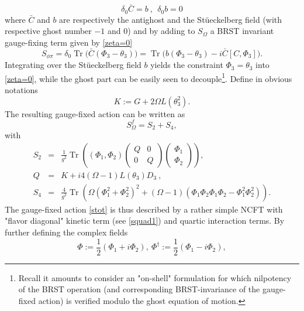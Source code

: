 \documentclass[a4paper,11pt,twoside]{article}
\numberwithin{equation}{section}
\DeclareMathOperator{\tr}{Tr}
\theoremstyle{nonumberplain}
\newcounter{and}
\begin{document}
%
\begin{equation}
\delta_0 {\bar{C}} = b \ , \ \ \delta_0b = 0 \label{contractible-brs}
\end{equation}
%
where ${\bar{C}}$ and $b$ are respectively the antighost and the St\"ueckelberg field (with respective ghost number $-1$ and $0$) and by adding to $S_\Omega$ a BRST invariant gauge-fixing term given by \eqref{zeta=0}%
%
\begin{equation}
S_{\phi\pi}=\delta_0\tr\big({\bar{C}}(\Phi_3-\theta_3) \big)=\tr\big(b(\Phi_3-\theta_3)-i{\bar{C}}[C,\Phi_3]\big)\label{gauge-fix}.
\end{equation}
%
Integrating over the St\"ueckelberg field $b$ yields the constraint $\Phi_3=\theta_3$ into \eqref{zeta=0}, while the ghost part can be easily seen to decouple{\footnote{Recall it amounts to consider an "on-shell" formulation for which nilpotency of the BRST operation (and corresponding BRST-invariance of the gauge-fixed action) is verified modulo the ghost equation of motion.}}. Define in obvious notations%
%
\begin{equation}
K:=G+2\Omega L(\theta_3^2)\label{operator-K}.
\end{equation}
%
The resulting gauge-fixed action can be written as%
%
\begin{equation}
S^f_\Omega=S_2+S_4\label{stot},
\end{equation}
with%
\begin{eqnarray}
S_2 &=& \frac{1}{g^2} \tr \left((\Phi_1,\Phi_2)
\begin{pmatrix}
Q&0\\
0&Q
\end{pmatrix} 
\begin{pmatrix}
\Phi_1\\
\Phi_2
\end{pmatrix} 
\right) , \nonumber \\
Q &=& K + i 4 (\Omega-1) L(\theta_3) D_3 \ , \label{squad1} \\[5pt]
S_4 &=& \frac{4}{g^2} \tr \left( \Omega (\Phi_1^2 + \Phi_2^2)^2 + (\Omega-1)(\Phi_1\Phi_2\Phi_1\Phi_2 - \Phi_1^2\Phi_2^2) \right) . \label{squart}
\end{eqnarray}
%
The gauge-fixed action \eqref{stot} is thus described by a rather simple NCFT with "flavor diagonal" kinetic term (see \eqref{squad1}) and quartic interaction terms. By further defining the complex fields%
%
\begin{equation}
\Phi:=\frac{1}{2}(\Phi_1+i\Phi_2),\ \Phi^\dag:=\frac{1}{2}(\Phi_1-i\Phi_2),
\end{equation}
\end{document}
